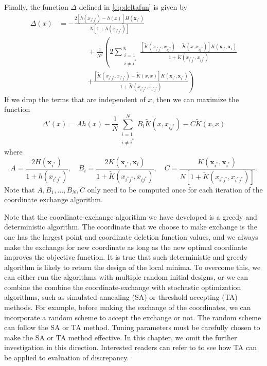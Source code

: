 \documentclass[graybox]{svmult}
\newcommand{\vx}{\boldsymbol{x}}
\newcommand{\tK}{\widetilde{K}}
\begin{document}
Finally, the  function $\Delta$ defined in \eqref{eq:deltafun} is given by
\begin{align}\label{eq:deltafunction}
\nonumber
\Delta(x)
&= -\frac{2\left[  h(x_{i^*j^*})-h(x)    \right]H(\vx_{i^*})}{N[1 + h(x_{i^*j^*})]}   \\
\nonumber
& \qquad \qquad +\frac{1}{N^2}\left(2\sum_{\substack{i=1 \\ i \ne i^*}}^N  \frac{[\tK(x_{i^*j^*},x_{ij^*})-\tK(x,x_{ij^*})] K(\vx_{i^*},\vx_i)} {1 + \tK(x_{i^*j^*},x_{ij^*})} \right . \\
\nonumber
& \qquad \qquad \left . + \frac{[\tK(x_{i^*j^*},x_{i^*j^*})-\tK(x,x)] K(\vx_{i^*},\vx_{i^*})} {1 + \tK(x_{i^*j^*},x_{i^*j^*})} \right )
\end{align} 
If we drop the terms that are independent of $x$, then we can maximize the function
\begin{equation*} %
\Delta'(x) = Ah(x)  - \frac{1}{N}\sum_{\substack{i=1 \\ i \ne i^*}}^N B_i \tK(x,x_{ij^*}) - C \tK(x,x)
\end{equation*}
where
\begin{equation*}
A = \frac{2H(\vx_{i^*})}{1 + h(x_{i^*j^*})}, \quad
B_i  = \frac{2K(\vx_{i^*},\vx_i)} {1 + \tK(x_{i^*j^*},x_{ij^*})}, \quad
C  = \frac{K(\vx_{i^*},\vx_{i^*})} {N[1 + \tK(x_{i^*j^*},x_{i^*j^*})]}.
\end{equation*}
Note that $A, B_1, \ldots, B_N, C$ only need to be computed once for each iteration of the coordinate exchange algorithm.

Note that the coordinate-exchange algorithm we have developed is a greedy and deterministic algorithm. 
The coordinate that we choose to make exchange is the one has the largest point and coordinate deletion function values, and we always make the exchange for new coordinate as long as the new optimal coordinate improves the objective function. 
It is true that such deterministic and greedy algorithm is likely to return the design of the local minima. 
To overcome this, we can either run the algorithms with multiple random initial designs, or we can combine the combine the coordinate-exchange with stochastic optimization algorithms, such as simulated annealing (SA) \cite{kirkpatrick1983optimization} or threshold accepting (TA) \cite{fang2003lower} methods. 
For example, before making the exchange of the coordinates, we can incorporate a random scheme to accept the exchange or not. 
The random scheme can follow the SA or TA method. 
Tuning parameters must be carefully chosen to make the SA or TA method effective. 
In this chapter, we omit the further investigation in this direction. 
Interested readers can refer to \cite{winker1997application} to see how TA can be applied to evaluation of discrepancy. 
\end{document}
